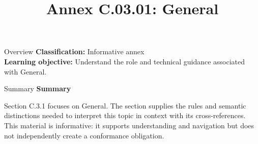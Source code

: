 \documentclass[10pt,letterpaper]{article}
\title{Annex C.03.01: General}
\author{}
\date{}
\begin{document}
\maketitle
\begin{CornellOverviewBox}{Overview}
\textbf{Classification:} Informative annex\\[2pt]
\textbf{Learning objective:} Understand the role and technical guidance associated with General.
\end{CornellOverviewBox}\begin{CornellSummaryBox}{Summary}
{\sffamily\bfseries\color{Accent} Summary}\par\vspace{3pt}Section C.3.1 focuses on General. The section supplies the rules and semantic distinctions needed to interpret this topic in context with its cross-references. This material is informative: it supports understanding and navigation but does not independently create a conformance obligation.
\end{CornellSummaryBox}
\end{document}
